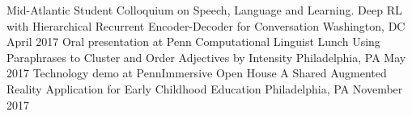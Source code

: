 \begin{cventries}
    \cventrynobullet
        {Mid-Atlantic Student Colloquium on Speech, Language and Learning.}
        {Deep RL with Hierarchical Recurrent Encoder-Decoder for Conversation}
        {Washington, DC}
        {April 2017}
        {}
    \cventrynobullet
        {Oral presentation at Penn Computational Linguist Lunch}
        {Using Paraphrases to Cluster and Order Adjectives by Intensity}
        {Philadelphia, PA}
        {May 2017}
        {}
    \cventrynobullet
        {Technology demo at PennImmersive Open House}
        {A Shared Augmented Reality Application for Early Childhood Education}
        {Philadelphia, PA}
        {November 2017}
        {}
 \end{cventries}
